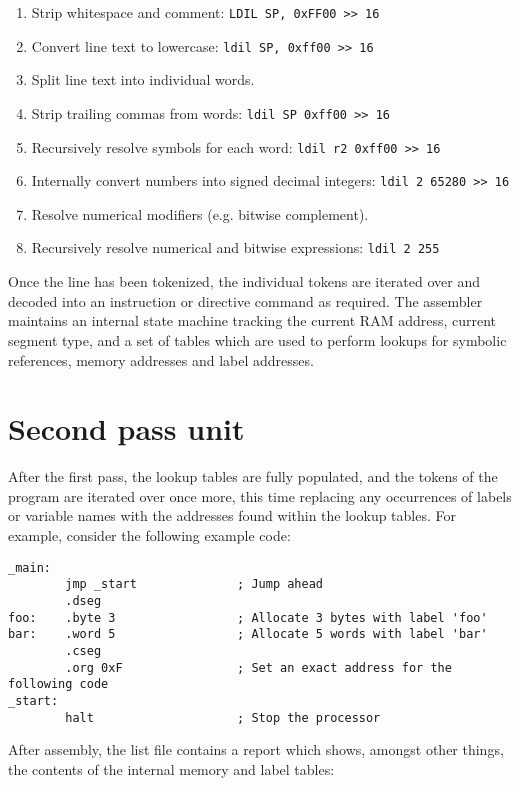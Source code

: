 \documentclass[12pt,twoside]{report}
\begin{document}
\begin{enumerate}
\item Strip whitespace and comment: \texttt{LDIL SP, 0xFF00 >> 16}
\item Convert line text to lowercase: \texttt{ldil SP, 0xff00 >> 16}
\item Split line text into individual words.
\item Strip trailing commas from words: \texttt{ldil SP 0xff00 >> 16}
\item Recursively resolve symbols for each word: \texttt{ldil r2 0xff00 >> 16}
\item Internally convert numbers into signed decimal integers: \texttt{ldil 2 65280 >> 16}
\item Resolve numerical modifiers (e.g. bitwise complement).
\item Recursively resolve numerical and bitwise expressions: \texttt{ldil 2 255}
\end{enumerate}

Once the line has been tokenized, the individual tokens are iterated
over and decoded into an instruction or directive command as
required. The assembler maintains an internal state machine tracking
the current RAM address, current segment type, and a set of tables
which are used to perform lookups for symbolic references, memory
addresses and label addresses.

\section{Second pass unit}

After the first pass, the lookup tables are fully populated, and the
tokens of the program are iterated over once more, this time replacing
any occurrences of labels or variable names with the addresses found
within the lookup tables. For example, consider the following example
code:

\begin{verbatim}
_main:
        jmp _start              ; Jump ahead
        .dseg
foo:    .byte 3                 ; Allocate 3 bytes with label 'foo'
bar:    .word 5                 ; Allocate 5 words with label 'bar'
        .cseg
        .org 0xF                ; Set an exact address for the following code
_start:
        halt                    ; Stop the processor
\end{verbatim}

After assembly, the list file contains a report which shows, amongst
other things, the contents of the internal memory and label tables:
\end{document}
